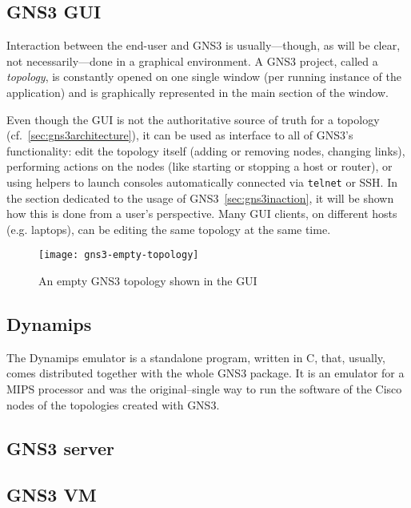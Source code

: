 

\subsection{GNS3 GUI}
\label{subsec:gns3gui}

Interaction between the end-user and GNS3 is usually---though, as will be clear, not necessarily---done in a graphical environment.
A GNS3 project, called a \emph{topology}, is constantly opened on one single window (per running instance of the application) and is graphically represented in the main section of the window.

Even though the GUI is not the authoritative source of truth for a topology (cf.~\ref{sec:gns3architecture}), it can be used as interface to all of GNS3's functionality: edit the topology itself (adding or removing nodes, changing links), performing actions on the nodes (like starting or stopping a host or router), or using helpers to launch consoles automatically connected via \texttt{telnet} or SSH.
In the section dedicated to the usage of GNS3~\ref{sec:gns3inaction}, it will be shown how this is done from a user's perspective.
Many GUI clients, on different hosts (e.g. laptops), can be editing the same topology at the same time. %

\begin{figure}
  \centering
  \texttt{[image: gns3-empty-topology]}
  \caption{An empty GNS3 topology shown in the GUI}
  \label{fig:gns3-empty-topology}
\end{figure}

\subsection{Dynamips}
\label{subsec:gns3dynamips}

The Dynamips emulator is a standalone program, written in C, that, usually, comes distributed together with the whole GNS3 package.
It is an emulator for a MIPS processor and was the original--single way to run the software of the Cisco nodes of the topologies created with GNS3.


\subsection{GNS3 server}
\label{subsec:gns3server}


\subsection{GNS3 VM}
\label{subsec:gns3vm}

